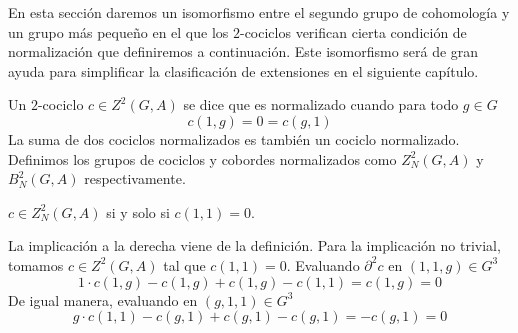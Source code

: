 En esta sección daremos un isomorfismo entre el segundo grupo de cohomología y un grupo más pequeño en el que los $2$-cociclos verifican cierta condición de normalización que definiremos a continuación. Este isomorfismo será de gran ayuda para simplificar la clasificación de extensiones en el siguiente capítulo.

%

\begin{definicion}%
	Un $2$-cociclo $c\in Z^2(G,A)$ se dice que es normalizado cuando para todo $g\in G$
	\begin{equation*}
		c(1,g)= 0 = c(g,1)
	\end{equation*}
	La suma de dos cociclos normalizados es también un cociclo normalizado. Definimos los grupos de cociclos y cobordes normalizados como $Z^2_N(G,A)$ y $B^2_N(G,A)$ respectivamente.
\end{definicion}

\begin{proposicion}
	$c\in Z^2_N(G,A)$ si y solo si $c(1,1)=0$.
	\begin{demostracion}
		La implicación a la derecha viene de la definición. Para la implicación no trivial, tomamos $c\in Z^2(G,A)$ tal que $c(1,1) = 0$. 
		Evaluando $\partial^2 c$ en $(1,1,g)\in G^3$
		\begin{equation*}
			1\cdot c(1,g) - c(1,g) + c(1,g) - c(1,1) = c(1,g) =0
		\end{equation*} 
		De igual manera, evaluando en $(g,1,1)\in G^3$
		\begin{equation*}
			g\cdot c(1,1) - c(g,1) + c(g,1) - c(g,1) = -c(g,1) = 0
		\end{equation*}
	\end{demostracion}
\end{proposicion}

